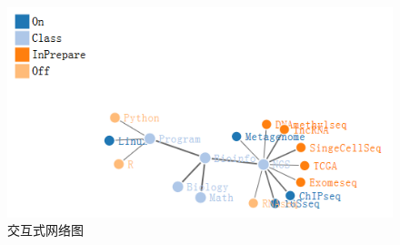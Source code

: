 \documentclass[]{article}
\numberwithin{figure}{section}
\numberwithin{table}{section}
\theoremstyle{definition}
\theoremstyle{definition}
\theoremstyle{definition}
\theoremstyle{remark}
\begin{document}
\begin{figure}[H]

{\centering \includegraphics[width=0.95\linewidth,height=0.7\textheight,keepaspectratio]{images/network_train} 

}

\caption{交互式网络图}\label{fig:unnamed-chunk-238}
\end{figure}
\end{document}
